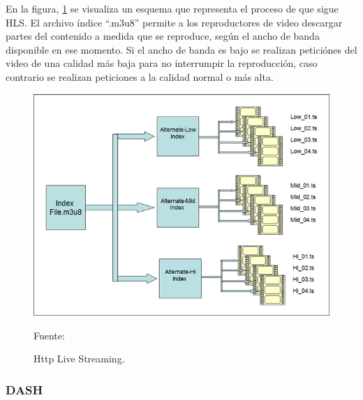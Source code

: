 En la figura, \ref{fig:hls} se visualiza un esquema que representa el proceso de que sigue HLS. El archivo índice ``.m3u8'' permite a los reproductores de video descargar partes del contenido a medida que se reproduce, según el ancho de banda disponible en ese momento. Si el ancho de banda es bajo se realizan peticiónes del video de una calidad más baja para no interrumpir la reproducción, caso contrario se realizan peticiones a la calidad normal o más alta.
\begin{figure}[H]
    \begin{center}
        \includegraphics[width=13cm]{img/capitulo_2/hls.jpg}
        \caption{Http Live Streaming.\\}
        Fuente: \cite{hls}
        \label{fig:hls}
    \end{center}
\end{figure}

\subsubsection{DASH}


